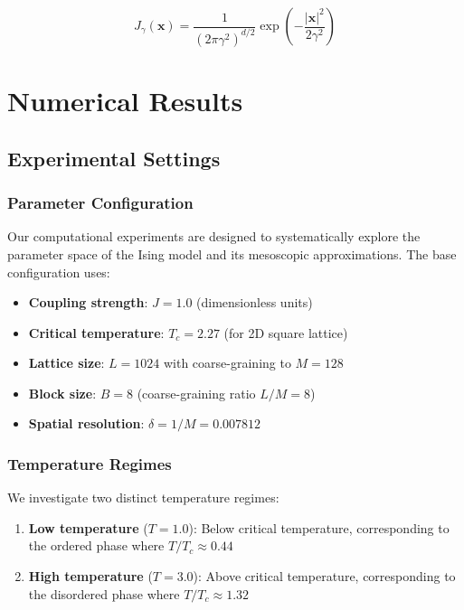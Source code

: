 \documentclass[11pt,a4paper]{article}
\begin{document}
\begin{equation}
    J_\gamma(\mathbf{x}) = \frac{1}{(2\pi\gamma^2)^{d/2}} \exp\left(-\frac{|\mathbf{x}|^2}{2\gamma^2}\right)
\end{equation}


\section{Numerical Results}
\subsection{Experimental Settings}

\subsubsection{Parameter Configuration}

Our computational experiments are designed to systematically explore the parameter space of the Ising model and its mesoscopic approximations. The base configuration uses:

\begin{itemize}
    \item \textbf{Coupling strength}: $J = 1.0$ (dimensionless units)
    \item \textbf{Critical temperature}: $T_c = 2.27$ (for 2D square lattice)
    \item \textbf{Lattice size}: $L = 1024$ with coarse-graining to $M = 128$
    \item \textbf{Block size}: $B = 8$ (coarse-graining ratio $L/M = 8$)
    \item \textbf{Spatial resolution}: $\delta = 1/M = 0.007812$
\end{itemize}

\subsubsection{Temperature Regimes}

We investigate two distinct temperature regimes:

\begin{enumerate}
    \item \textbf{Low temperature} ($T = 1.0$): Below critical temperature, corresponding to the ordered phase where $T/T_c \approx 0.44$
    \item \textbf{High temperature} ($T = 3.0$): Above critical temperature, corresponding to the disordered phase where $T/T_c \approx 1.32$
\end{enumerate}
\end{document}
